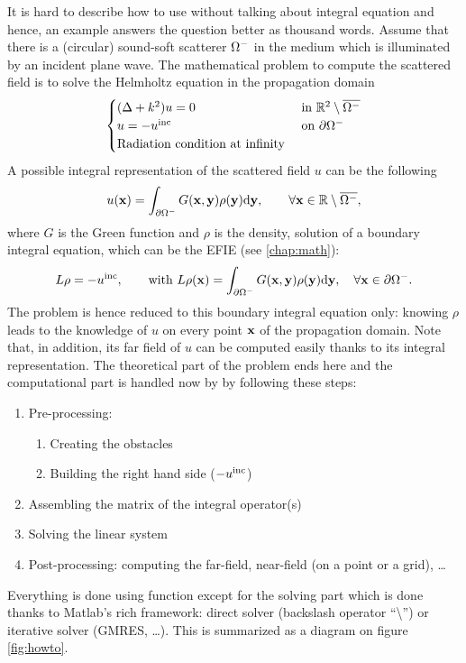It is hard to describe how to use \mudiff without talking about integral equation and hence, an example answers the question better as thousand words. Assume that there is a (circular) sound-soft scatterer $\Omega^-$ in the medium which is  illuminated by an incident plane wave. The mathematical problem to compute the scattered field is to solve the Helmholtz equation in the propagation domain
$$
\begin{cases}
(\Delta+k^2)u = 0 & \text{ in }{\mathbb{R}}^2\setminus\overline{\Omega^-}\\
u = -u^{\textrm{inc}}&\text{ on }\partial\Omega^-\\
\text{Radiation condition at infinity}
\end{cases}
$$
A possible integral representation of the scattered field $u$ can be the following
$$
u({\mathbf{x}}) = \int_{\partial\Omega^-} G({\mathbf{x}},{\mathbf{y}})\rho({\mathbf{y}}){\rm d}{\mathbf{y}}, \qquad \forall {\mathbf{x}}\in{\mathbb{R}}\setminus\overline{\Omega^-},
$$
where $G$ is the Green function and $\rho$ is the density, solution of a boundary integral equation, which can be the EFIE (see \ref{chap:math}):
$$
L\rho = -u^{\textrm{inc}}, \qquad \text{with } L\rho({\mathbf{x}}) = \int_{\partial\Omega^-} G({\mathbf{x}},{\mathbf{y}})\rho({\mathbf{y}}){\rm d}{\mathbf{y}}, \quad \forall {\mathbf{x}}\in\partial\Omega^-.
$$
The problem is hence reduced to this boundary integral equation only: knowing $\rho$ leads to the knowledge of $u$ on every point ${\mathbf{x}}$ of the propagation domain. Note that, in addition, its far field of $u$ can be computed easily thanks to its integral representation. The theoretical part of the problem ends here and the computational part is handled now by \mudiff by following these steps:
\begin{enumerate}
\item Pre-processing: 
\begin{enumerate}
\item Creating the obstacles
\item Building the right hand side ($-u^{\textrm{inc}}$)
\end{enumerate}
\item Assembling the matrix of the integral operator(s)
\item Solving the linear system
\item Post-processing: computing the far-field, near-field (on a point or a grid), \ldots
\end{enumerate}

Everything is done using \mudiff function except for the solving part which is done thanks to Matlab's rich framework: direct solver (backslash operator ``\textbackslash'') or iterative solver (GMRES, \ldots). This is summarized as a diagram on figure \ref{fig:howto}.

